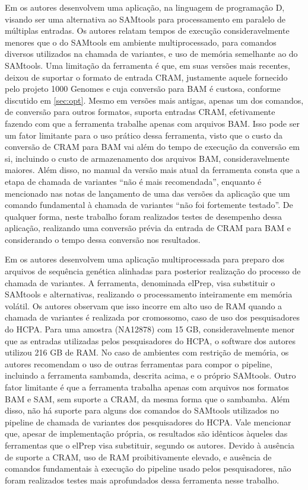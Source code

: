 \documentclass[cic,tc]{iiufrgs}
\begin{document}
Em \cite{tarasov2015sambamba} os autores desenvolvem uma aplicação, na
linguagem de programação D, visando ser uma alternativa ao SAMtools para
processamento em paralelo de múltiplas entradas. Os autores relatam tempos de
execução consideravelmente menores que o do SAMtools em ambiente
multiprocessado, para comandos diversos utilizados na chamada de variantes, e
uso de memória semelhante ao do SAMtools. Uma limitação da ferramenta é que, em
suas versões mais recentes, deixou de suportar o formato de entrada CRAM,
justamente aquele fornecido pelo projeto 1000 Genomes e cuja conversão para BAM é
custosa, conforme discutido em \ref{sec:opt}. Mesmo em versões mais antigas,
apenas um dos comandos, de conversão para outros formatos, suporta entradas
CRAM, efetivamente fazendo com que a ferramenta trabalhe apenas com arquivos
BAM. Isso pode ser um fator limitante para o uso prático dessa ferramenta,
visto que o custo da conversão de CRAM para BAM vai além do tempo de execução
da conversão em si, incluindo o custo de armazenamento dos arquivos BAM,
consideravelmente maiores. Além disso, no manual da versão mais atual da
ferramenta consta que a etapa de chamada de variantes ``não é mais
recomendada'', enquanto é mencionado nas notas de lançamento de uma das versões
da aplicação que um comando fundamental à chamada de variantes ``não
foi fortemente testado''.\cite{manual2015sambamba} De qualquer forma, neste
trabalho foram realizados testes de desempenho dessa aplicação, realizando uma
conversão prévia da entrada de CRAM para BAM e considerando o tempo dessa
conversão nos resultados.

Em \cite{herzeel2015elprep} os autores desenvolvem uma aplicação
multiprocessada para preparo dos arquivos de sequência genética alinhadas para
posterior realização do processo de chamada de variantes. A ferramenta,
denominada elPrep, visa substituir o SAMtools e alternativas, realizando o
processamento inteiramente em memória volátil. Os autores observam que isso
incorre em alto uso de RAM quando a chamada de variantes é realizada por
cromossomo, caso de uso dos pesquisadores do HCPA. Para uma amostra (NA12878)
com 15 GB, consideravelmente menor que as entradas utilizadas pelos
pesquisadores do HCPA, o software dos autores utilizou 216 GB de RAM. No caso de
ambientes com restrição de memória, os autores recomendam o uso de outras
ferramentas para compor o pipeline, incluindo a ferramenta sambamda, descrita
acima, e o próprio SAMtools. Outro fator limitante é que a ferramenta trabalha
apenas com arquivos nos formatos BAM e SAM, sem suporte a CRAM, da mesma forma
que o sambamba. Além disso, não há suporte para alguns dos comandos do
SAMtools utilizados no pipeline de chamada de variantes dos pesquisadores do
HCPA. Vale mencionar que, apesar de implementação própria, os resultados são
idênticos àqueles das ferramentas que o elPrep visa substituir, segundo os
autores. Devido à ausência de suporte a CRAM, uso de RAM proibitivamente
elevado, e ausência de comandos fundamentais à execução do pipeline usado pelos
pesquisadores, não foram realizados testes mais aprofundados dessa ferramenta
nesse trabalho.
\end{document}
